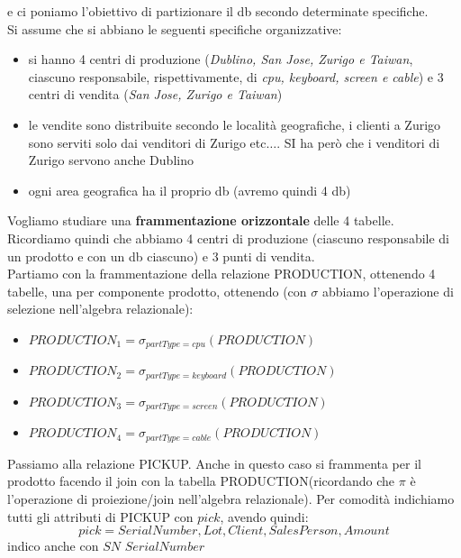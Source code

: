 \documentclass[a4paper,12pt, oneside]{book}
\begin{document}
\begin{esercizio}
  e ci poniamo l'obiettivo di partizionare il db secondo determinate
  specifiche.\\
  Si assume che si abbiano le seguenti specifiche organizzative:
  \begin{itemize}
    \item si hanno 4 centri di produzione (\textit{Dublino, San Jose, Zurigo
      \textnormal{e} Taiwan}, ciascuno responsabile, rispettivamente, di
    \textit{cpu, keyboard, screen \textnormal{e} cable}) e 3 centri di vendita
    (\textit{San Jose, Zurigo  \textnormal{e} Taiwan})
    \item le vendite sono distribuite secondo le località geografiche, i clienti
    a Zurigo sono serviti solo dai venditori di Zurigo etc$\ldots$. SI ha però
    che i venditori di  Zurigo servono anche Dublino
    \item ogni area geografica ha il proprio db (avremo quindi 4 db)
  \end{itemize}
  Vogliamo studiare una \textbf{frammentazione orizzontale} delle 4 tabelle.\\
  Ricordiamo quindi che abbiamo 4 centri di produzione (ciascuno responsabile di
  un prodotto e con un db ciascuno) e 3 punti di vendita.\\
  Partiamo con la frammentazione della relazione \textnormal{PRODUCTION},
  ottenendo 4 tabelle, una per componente prodotto, ottenendo (con $\sigma$
  abbiamo l'operazione di selezione nell'algebra relazionale):
  \begin{itemize}
    \item $PRODUCTION_1=\sigma_{partType=cpu}(PRODUCTION)$
    \item $PRODUCTION_2=\sigma_{partType=keyboard}(PRODUCTION)$
    \item $PRODUCTION_3=\sigma_{partType=screen}(PRODUCTION)$
    \item $PRODUCTION_4=\sigma_{partType=cable}(PRODUCTION)$    
  \end{itemize}
  Passiamo alla relazione \textnormal{PICKUP}. Anche in questo caso si frammenta
  per il prodotto facendo il join con la tabella
  \textnormal{PRODUCTION}(ricordando che $\pi$ è l'operazione di proiezione/join 
  nell'algebra relazionale). Per comodità indichiamo tutti gli attributi di
  \textnormal{PICKUP} con $pick$, avendo quindi:
  \[pick=SerialNumber, Lot, Client, SalesPerson, Amount\]
  indico anche con $SN$ $SerialNumber$
\end{esercizio}
\end{document}
